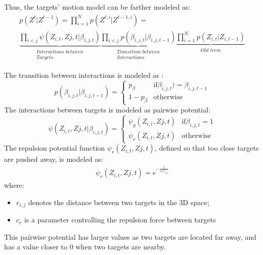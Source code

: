 Thus, the targets’ motion model can be farther modeled as:
\begin{eqnarray}\label{eqn: transition factorized 2}
p(Z^{t} |Z^{t-1} ) = \prod_{i=1}^{N} p(Z^{t,i} | Z^{t-1,i})= \nonumber \\
\underbrace{\prod_{i<j} \psi(Z_{i,t} , Z{j,t} |\beta_{i,j,t})}_{\substack{\textit{Interactions between} \\ \textit{Targets}}}
\underbrace{\prod_{i<j} p(\beta_{i,j,t} |\beta_{i,j,t-1} ) }_{\substack{\textit{Transition between} \\ \textit{Interactions}}}
\underbrace{\prod_{i=1}^{N} p(Z_{i,t} |Z_{i,t-1})}_{\substack{\textit{Old term} }}
\end{eqnarray}

The transition between interactions is modeled as :
$$
 p(\beta_{i,j,t} |\beta_{i,j,t-1} )= \left\{
\begin{array}{rl}
 p_{\beta}  & \mbox{if} \beta_{i,j,t} ) = \beta_{i,j,t-1}  \\
 1- p_{\beta} & \mbox{otherwise}
\end{array}
\right.
$$
The interactions between targets is modeled as pairwise potential:
$$
\psi(Z_{i,t} , Z{j,t} | \beta_{i,j,t} )= \left\{
\begin{array}{rl}
 \psi_g(Z_{i,t} , Z{j,t}) & \mbox{if} \beta_{i,j,t}=1	 \\
 \psi_r(Z_{i,t} , Z{j,t}) & \mbox{otherwise}
\end{array}
\right.
$$
The repulsion potential function  $\psi_r(Z_{i,t} , Z{j,t})$, defined so that
too close targets are pushed away, is modeled as:
\begin{eqnarray}\label{eqn: transition factorized 2}
\psi_r(Z_{i,t} , Z{j,t}) = e^{-\frac{1}{c_r r_{i,j}}}
\end{eqnarray}
where:
\begin{itemize}
\item $r_{i,j}$ denotes the distance between two targets in the 3D space;
\item $c_r$ is a parameter controlling the repulsion force between targets
\end{itemize}
This pairwise potential has larger values as two targets are located far away, and has a value closer to $0$ when two targets are nearby.

